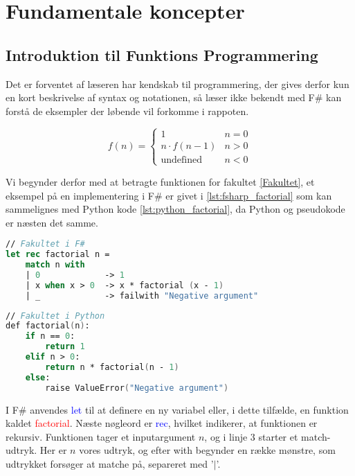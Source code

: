 
\section{Fundamentale koncepter}
\subsection{Introduktion til Funktions Programmering}

Det er forventet af læseren har kendskab til programmering, der gives derfor kun en kort beskrivelse af syntax og notationen, så læser ikke bekendt med F\# kan forstå de eksempler der løbende vil forkomme i rappoten.

\begin{equation}
    \label{Fakultet}
    f(n) = \begin{cases} 
            1 &  n = 0  \\
            n \cdot f(n-1) & n > 0 \\
            \text{undefined} & n < 0 
           \end{cases}
\end{equation}

Vi begynder derfor med at betragte funktionen for fakultet \ref{Fakultet}, et eksempel på en implementering i F\# er givet i \ref{lst:fsharp_factorial} som kan sammelignes med Python kode \ref{lst:python_factorial}, da Python og pseudokode er næsten det samme. 

\begin{lstlisting}[language={FSharp}, label={lst:fsharp_factorial}, caption={Eksempel på Fakultet i F\#}]
// Fakultet i F#
let rec factorial n =
    match n with
    | 0             -> 1 
    | x when x > 0  -> x * factorial (x - 1)
    | _             -> failwith "Negative argument"
\end{lstlisting}

\begin{lstlisting}[language={FSharp}, label={lst:python_factorial}, caption={Eksempel på Fakultet i Python}]
// Fakultet i Python
def factorial(n):
    if n == 0:
        return 1
    elif n > 0:
        return n * factorial(n - 1)
    else:
        raise ValueError("Negative argument")
\end{lstlisting}

I F\# anvendes \textcolor{blue}{let} til at definere en ny variabel eller, i dette tilfælde, en funktion kaldet \textcolor{red}{factorial}. Næste nøgleord er \textcolor{blue}{rec}, hvilket indikerer, at funktionen er rekursiv. Funktionen tager et inputargument \(n\), og i linje 3 starter et match-udtryk. Her er \(n\) vores udtryk, og efter \textcolor{codepurple}{with} begynder en række mønstre, som udtrykket forsøger at matche på, separeret med '$\vert$'.

